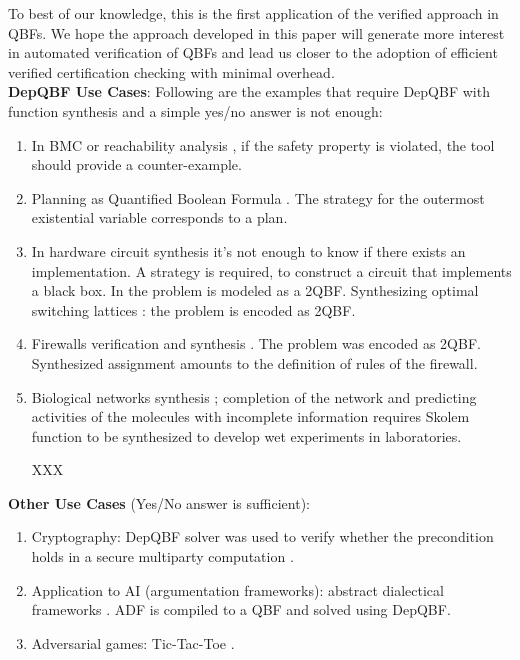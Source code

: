 \documentclass[runningheads]{llncs}
\newcommand{\0}{0}
\newcommand{\1}{1}
\begin{document}
To best of our knowledge, this is the first application of the verified approach in QBFs. We hope the approach developed in this paper will generate more interest in automated verification of QBFs and lead us closer to the adoption of efficient verified certification checking with minimal overhead. \\
 
 
\textbf{DepQBF Use Cases}: 
Following are the examples that require DepQBF with function synthesis and a simple yes/no answer is not enough:
\begin{enumerate}
	\item In BMC or reachability analysis \cite{BloemKS14}, if the safety property is violated, the tool should provide a counter-example. 
	
	\item Planning as Quantified Boolean Formula \cite{Cashmore2012planning, EglyKLP17, Gasquet18}. The strategy for the outermost existential variable corresponds to a plan. 
	\item In hardware circuit synthesis \cite{BloemEKKL14, BloemKS14, Faymonville2017, Subramanyan2013, Li2013} it's not enough to know if there exists an implementation. A strategy is required, to construct a circuit that implements a black box. In \cite{Subramanyan2013, Li2013} the problem is modeled as a 2QBF. Synthesizing optimal switching lattices \cite{Gange2014synthesizing}: the problem is encoded as 2QBF. 
	\item Firewalls verification and synthesis \cite{Zhang2012verification}. The problem was encoded as 2QBF. Synthesized assignment amounts to the definition of rules of the firewall.
	\item Biological networks synthesis \cite{GuptaMS18}; completion of the network and predicting activities of the molecules with incomplete information requires Skolem function to be synthesized to develop wet experiments in laboratories.  
 	
 	XXX
\end{enumerate}

\textbf{Other Use Cases} (Yes/No answer is sufficient):
\begin{enumerate}
    \item Cryptography: DepQBF solver was used to verify whether the precondition holds in a secure multiparty computation \cite{Launchbury2014application}. 
	\item Application to AI (argumentation frameworks): abstract dialectical frameworks \cite{Brewka2020solving, Diller2014reasoning}. ADF is compiled to a QBF and solved using DepQBF.
	\item Adversarial games: Tic-Tac-Toe \cite{DiptaramaYS16}.
\end{enumerate}
\end{document}
